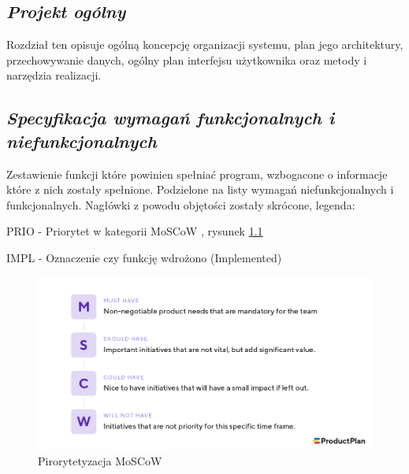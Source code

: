 \documentclass[a4paper, 10pt, twoside, openright]{report}
\newcommand{\customstylechapter}[1]{\large{\textit{#1}}}
\newcommand{\customstylesection}[1]{\textbf{\textit{#1}}}
\begin{document}
\begin{large}
\chapter{\customstylechapter{Projekt ogólny}}
{Rozdział ten opisuje ogólną koncepcję organizacji systemu, plan jego 
architektury, przechowywanie danych, ogólny plan interfejsu użytkownika oraz 
metody i narzędzia realizacji.}


\section{\customstylesection{Specyfikacja wymagań funkcjonalnych i niefunkcjonalnych}}
{Zestawienie funkcji które powinien spełniać program, wzbogacone o informacje 
które z nich zostały spełnione. Podzielone na listy wymagań niefunkcjonalnych i 
funkcjonalnych. Nagłówki z powodu objętości zostały skrócone, legenda:}

{PRIO - Priorytet w kategorii MoSCoW \cite{MOSCOW}, rysunek \ref{fig:moscow}}

{IMPL - Oznaczenie czy funkcję wdrożono (Implemented)}

\begin{figure}[H]           %
    \centering
    \includegraphics[width=12cm]{figures/MoSCoW-01.png}
    \caption{Pirorytetyzacja MoSCoW}
    \label{fig:moscow}
\end{figure}


\end{large}
\end{document}
